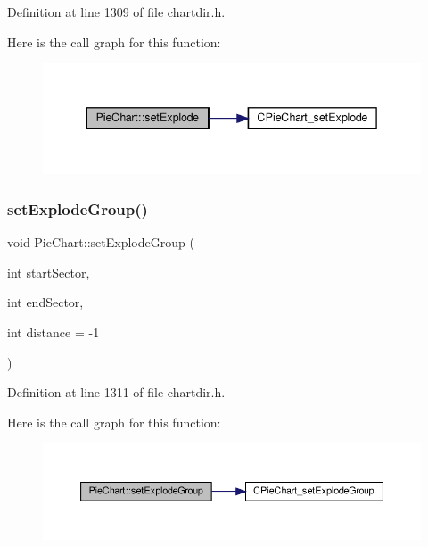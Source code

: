 Definition at line 1309 of file chartdir.\+h.

Here is the call graph for this function\+:
\nopagebreak
\begin{figure}[H]
\begin{center}
\leavevmode
\includegraphics[width=342pt]{class_pie_chart_a0c4c811dad237d549fc5461a51109a1a_cgraph}
\end{center}
\end{figure}
\mbox{\label{class_pie_chart_a48bc655eb7a303cf3083da3a494b60d9}} 
\subsubsection{\texorpdfstring{set\+Explode\+Group()}{setExplodeGroup()}}
{\footnotesize\ttfamily void Pie\+Chart\+::set\+Explode\+Group (\begin{DoxyParamCaption}\item[{int}]{start\+Sector,  }\item[{int}]{end\+Sector,  }\item[{int}]{distance = {\ttfamily -\/1} }\end{DoxyParamCaption})\hspace{0.3cm}{\ttfamily [inline]}}



Definition at line 1311 of file chartdir.\+h.

Here is the call graph for this function\+:
\nopagebreak
\begin{figure}[H]
\begin{center}
\leavevmode
\includegraphics[width=350pt]{class_pie_chart_a48bc655eb7a303cf3083da3a494b60d9_cgraph}
\end{center}
\end{figure}
\mbox{\label{class_pie_chart_ac78c35a17fa478ad58e4e3c19141778d}} 
